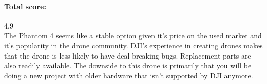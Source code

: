 \paragraph{Total score:}\mbox{4.9} \\
The Phantom 4 seems like a stable option given it's price on the used market and it's popularity in the drone community. DJI's experience in creating drones makes that the drone is less likely to have deal breaking bugs. Replacement parts are also readily available. The downside to this drone is primarily that you will be doing a new project with older hardware that isn't supported by DJI anymore.